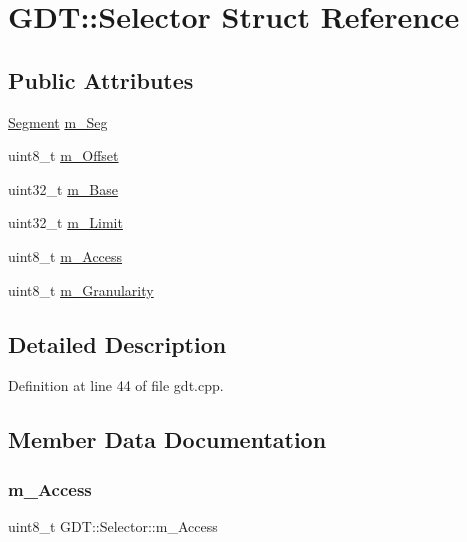 \hypertarget{struct_g_d_t_1_1_selector}{}\section{G\+DT\+:\+:Selector Struct Reference}
\label{struct_g_d_t_1_1_selector}
\subsection*{Public Attributes}
\begin{DoxyCompactItemize}
\item 
\hyperlink{namespace_g_d_t_af2b09941ee46a489ebaccfed5c839154}{Segment} \hyperlink{struct_g_d_t_1_1_selector_a7bff1504d5c83c498334332274bef26d}{m\+\_\+\+Seg}
\item 
uint8\+\_\+t \hyperlink{struct_g_d_t_1_1_selector_abc557df8df987b1dc2d523156ea0ef85}{m\+\_\+\+Offset}
\item 
uint32\+\_\+t \hyperlink{struct_g_d_t_1_1_selector_ac98d387038fb7ad18aab22332cb6350c}{m\+\_\+\+Base}
\item 
uint32\+\_\+t \hyperlink{struct_g_d_t_1_1_selector_a954aaf8e76a1f1aaaba2a7ca1b558e9f}{m\+\_\+\+Limit}
\item 
uint8\+\_\+t \hyperlink{struct_g_d_t_1_1_selector_aeba15cbab5fa33e66d06b136ece34ed3}{m\+\_\+\+Access}
\item 
uint8\+\_\+t \hyperlink{struct_g_d_t_1_1_selector_a7b5d40047c58c483e74a9037418c2203}{m\+\_\+\+Granularity}
\end{DoxyCompactItemize}


\subsection{Detailed Description}


Definition at line 44 of file gdt.\+cpp.



\subsection{Member Data Documentation}
\mbox{\label{struct_g_d_t_1_1_selector_aeba15cbab5fa33e66d06b136ece34ed3}} 
\subsubsection{\texorpdfstring{m\+\_\+\+Access}{m\_Access}}
{\footnotesize\ttfamily uint8\+\_\+t G\+D\+T\+::\+Selector\+::m\+\_\+\+Access}



